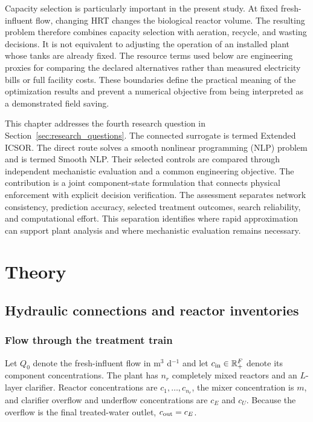 Capacity selection is particularly important in the present study. At fixed fresh-influent flow, changing HRT changes the biological reactor volume. The resulting problem therefore combines capacity selection with aeration, recycle, and wasting decisions. It is not equivalent to adjusting the operation of an installed plant whose tanks are already fixed. The resource terms used below are engineering proxies for comparing the declared alternatives rather than measured electricity bills or full facility costs. These boundaries define the practical meaning of the optimization results and prevent a numerical objective from being interpreted as a demonstrated field saving.

This chapter addresses the fourth research question in Section~\ref{sec:research_questions}. The connected surrogate is termed Extended ICSOR. The direct route solves a smooth nonlinear programming (NLP) problem and is termed Smooth NLP. Their selected controls are compared through independent mechanistic evaluation and a common engineering objective. The contribution is a joint component-state formulation that connects physical enforcement with explicit decision verification. The assessment separates network consistency, prediction accuracy, selected treatment outcomes, search reliability, and computational effort. This separation identifies where rapid approximation can support plant analysis and where mechanistic evaluation remains necessary.

\section{Theory}

\subsection{Hydraulic connections and reactor inventories}

\subsubsection{Flow through the treatment train}

Let $Q_0$ denote the fresh-influent flow in m$^3$ d$^{-1}$ and let $c_{\rm in}\in\mathbb R_+^F$ denote its component concentrations. The plant has $n_r$ completely mixed reactors and an $L$-layer clarifier. Reactor concentrations are $c_1,\ldots,c_{n_r}$, the mixer concentration is $m$, and clarifier overflow and underflow concentrations are $c_E$ and $c_U$. Because the overflow is the final treated-water outlet, $c_{\rm out}=c_E$.

